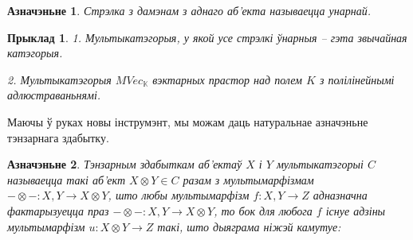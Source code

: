 \documentclass[a4paper,12pt]{book}
\newtheorem{example}{Прыклад}[section]
\newtheorem{definition}{Азначэньне}[section]
\begin{document}
\begin{definition}
  Стрэлка з дамэнам з аднаго аб'екта называецца унарнай.
\end{definition}

\begin{example}
  1. Мультыкатэгорыя, у якой усе стрэлкі ўнарныя -- гэта звычайная
  катэгорыя.

  2. Мультыкатэгорыя $MVec_{\mathbb{K}}$ вэктарных прастор над полем
  $K$ з полілінейнымі адлюстраваньнямі.
\end{example}

Маючы ў руках новы інструмэнт, мы можам даць натуральнае азначэньне
тэнзарнага здабытку.

\begin{definition}
  Тэнзарным здабыткам аб'ектаў $X$ і $Y$ мультыкатэгорыі $C$
  называецца такі аб'ект $X \otimes Y \in C$ разам з мультымарфізмам
  $- \otimes -: X, Y \rightarrow X \otimes Y$, што любы мультымарфізм
  $f: X, Y \rightarrow Z$ адназначна фактарызуецца праз $- \otimes -:
  X, Y \rightarrow X \otimes Y$, то бок для любога $f$ існуе адзіны
  мультымарфізм $u: X \otimes Y \rightarrow Z$ такі, што дыяграма
  ніжэй камутуе:

\end{definition}
\end{document}
